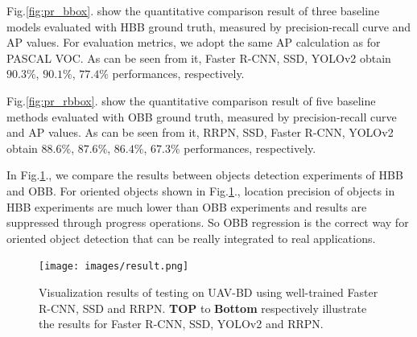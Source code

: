 Fig.\ref{fig:pr_bbox}. show the quantitative comparison result of three baseline models evaluated with HBB ground truth, measured by precision-recall curve and AP values. For evaluation metrics, we adopt the same AP calculation as for PASCAL VOC. As can be seen from it, Faster R-CNN, SSD, YOLOv2 obtain $ 90.3\% $, $ 90.1\% $, $ 77.4\% $ performances, respectively.


Fig.\ref{fig:pr_rbbox}. show the quantitative comparison result of five baseline methods evaluated with OBB ground truth, measured by precision-recall curve and AP values. As can be seen from it, RRPN, SSD, Faster R-CNN, YOLOv2 obtain $ 88.6\% $, $ 87.6\% $, $ 86.4\% $, $ 67.3\% $ performances, respectively.

In Fig.\ref{fig:result}., we compare the results between objects detection experiments of HBB and OBB. For oriented objects shown in Fig.\ref{fig:result}., location precision of objects in HBB 
experiments are much lower than OBB experiments and results are suppressed through progress operations. So OBB regression is the correct way for oriented object detection that can be really integrated to real applications.


\begin{figure}
	\texttt{[image: images/result.png]}
	\caption{Visualization results of testing on UAV-BD using well-trained Faster R-CNN, SSD and RRPN. \textbf{TOP} to \textbf{Bottom} respectively illustrate the results for Faster R-CNN, SSD, YOLOv2 and RRPN.}
	\label{fig:result}
\end{figure}


















